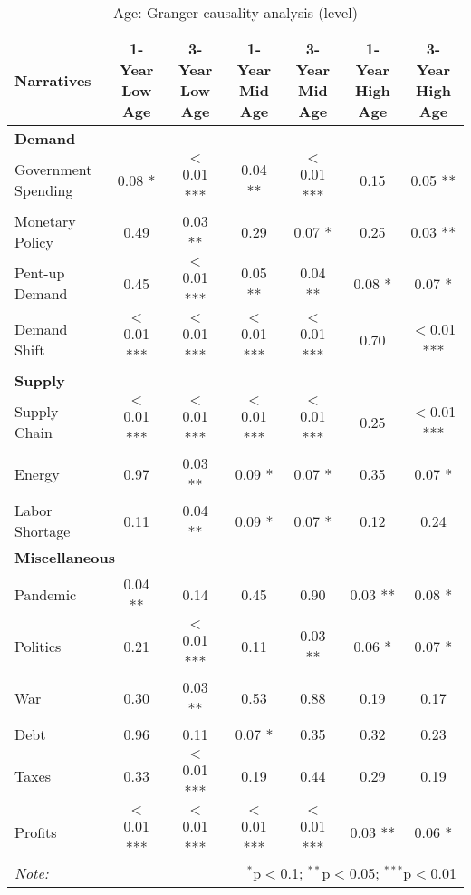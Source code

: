 \begin{sidewaystable}[ht]
\centering
\caption{Age: Granger causality analysis (level)}\label{table:granger}

\begin{tabular}{lcccccc}
\toprule
\textbf{Narratives} & \textbf{1-Year Low Age} & \textbf{3-Year Low Age} & \textbf{1-Year Mid Age} & \textbf{3-Year Mid Age} & \textbf{1-Year High Age} & \textbf{3-Year High Age} \\
\midrule
\multicolumn{7}{l}{\textbf{Demand}} \\
\midrule
Government Spending & 0.08 * & $<$0.01 *** & 0.04 ** & $<$0.01 *** & 0.15 & 0.05 ** \\
Monetary Policy & 0.49 & 0.03 ** & 0.29 & 0.07 * & 0.25 & 0.03 ** \\
Pent-up Demand & 0.45 & $<$0.01 *** & 0.05 ** & 0.04 ** & 0.08 * & 0.07 * \\
Demand Shift & $<$0.01 *** & $<$0.01 *** & $<$0.01 *** & $<$0.01 *** & 0.70 & $<$0.01 *** \\
\midrule
\multicolumn{7}{l}{\textbf{Supply}} \\
\midrule
Supply Chain & $<$0.01 *** & $<$0.01 *** & $<$0.01 *** & $<$0.01 *** & 0.25 & $<$0.01 *** \\
Energy & 0.97 & 0.03 ** & 0.09 * & 0.07 * & 0.35 & 0.07 * \\
Labor Shortage & 0.11 & 0.04 ** & 0.09 * & 0.07 * & 0.12 & 0.24 \\
\midrule
\multicolumn{7}{l}{\textbf{Miscellaneous}} \\
\midrule
Pandemic & 0.04 ** & 0.14 & 0.45 & 0.90 & 0.03 ** & 0.08 * \\
Politics & 0.21 & $<$0.01 *** & 0.11 & 0.03 ** & 0.06 * & 0.07 * \\
War & 0.30 & 0.03 ** & 0.53 & 0.88 & 0.19 & 0.17 \\
Debt & 0.96 & 0.11 & 0.07 * & 0.35 & 0.32 & 0.23 \\
Taxes & 0.33 & $<$0.01 *** & 0.19 & 0.44 & 0.29 & 0.19 \\
Profits & $<$0.01 *** & $<$0.01 *** & $<$0.01 *** & $<$0.01 *** & 0.03 ** & 0.06 * \\
\midrule
\bottomrule
\textit{Note:}  & \multicolumn{6}{r}{$^{*}$p$<$0.1; $^{**}$p$<$0.05; $^{***}$p$<$0.01} \\
\bottomrule
\end{tabular}
\end{sidewaystable}
